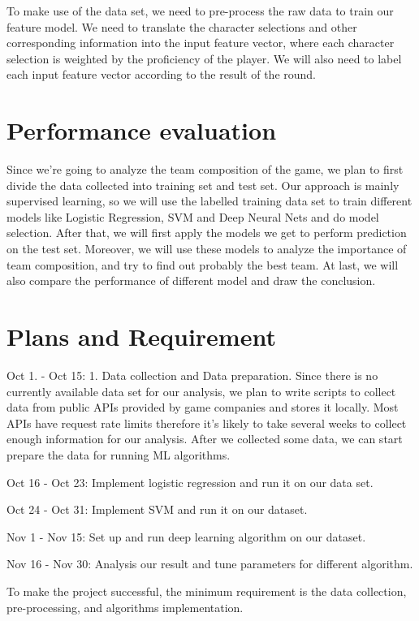 \documentclass[a4page]{article}
\begin{document}
To make use of the data set, we need to pre-process the raw data to train our feature model. We need to translate the character selections and other corresponding information into the input feature vector, where each character selection is weighted by the proficiency of the player. We will also need to label each input feature vector according to the result of the round.

\section{Performance evaluation}

Since we're going to analyze the team composition of the game, we plan to first divide the data collected into training set and test set. Our approach is mainly supervised learning, so we will use the labelled training data set to train different models like Logistic Regression, SVM and Deep Neural Nets and do model selection. After that, we will first apply the models we get to perform prediction on the test set. Moreover, we will use these models to analyze the importance of team composition, and try to find out probably the best team. At last, we will also compare the performance of different model and draw the conclusion.


\section{Plans and Requirement}

Oct 1. - Oct 15: 1. Data collection and Data preparation. Since there is no currently available  data set for our analysis, we plan to write scripts to collect data from public APIs provided by game companies and stores it locally. Most APIs have request rate limits therefore it's likely to take several weeks to collect enough information for our analysis. After we collected some data, we can start prepare the data for running ML algorithms.

Oct 16 -  Oct 23: Implement logistic regression and run it on our data set.

Oct 24 - Oct 31: Implement SVM and run it on our dataset.

Nov 1 - Nov 15: Set up and run deep learning algorithm on our dataset.

Nov 16 - Nov 30: Analysis our result and tune parameters for different algorithm.

To make the project successful, the minimum requirement is the data collection, pre-processing, and algorithms implementation.
\end{document}
